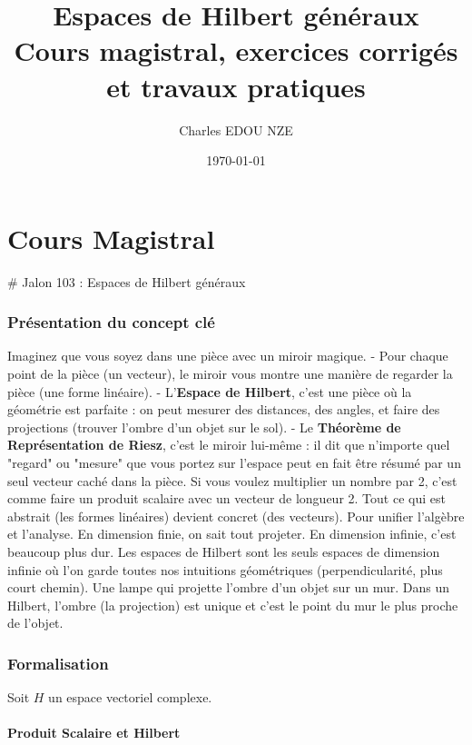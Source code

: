 \documentclass[11pt,a4paper]{article}
\title{\Huge Espaces de Hilbert généraux \\ \large Cours magistral, exercices corrigés et travaux pratiques}
\author{\Large Charles EDOU NZE}
\date{\today}
\begin{document}
\maketitle
\tableofcontents
\newpage

\part{Cours Magistral}

\# Jalon 103 : Espaces de Hilbert généraux

\section{Présentation du concept clé}

 Imaginez que vous soyez dans une pièce avec un miroir magique.
    - Pour chaque point de la pièce (un vecteur), le miroir vous montre une manière de regarder la pièce (une forme linéaire).
    - L'\textbf{Espace de Hilbert}, c'est une pièce où la géométrie est parfaite : on peut mesurer des distances, des angles, et faire des projections (trouver l'ombre d'un objet sur le sol).
    - Le \textbf{Théorème de Représentation de Riesz}, c'est le miroir lui-même : il dit que n'importe quel "regard" ou "mesure" que vous portez sur l'espace peut en fait être résumé par un seul vecteur caché dans la pièce. Si vous voulez multiplier un nombre par 2, c'est comme faire un produit scalaire avec un vecteur de longueur 2. Tout ce qui est abstrait (les formes linéaires) devient concret (des vecteurs).
 Pour unifier l'algèbre et l'analyse. En dimension finie, on sait tout projeter. En dimension infinie, c'est beaucoup plus dur. Les espaces de Hilbert sont les seuls espaces de dimension infinie où l'on garde toutes nos intuitions géométriques (perpendicularité, plus court chemin).
 Une lampe qui projette l'ombre d'un objet sur un mur. Dans un Hilbert, l'ombre (la projection) est unique et c'est le point du mur le plus proche de l'objet.

\section{Formalisation}

Soit $H$ un espace vectoriel complexe.

\subsection{Produit Scalaire et Hilbert}
\end{document}
